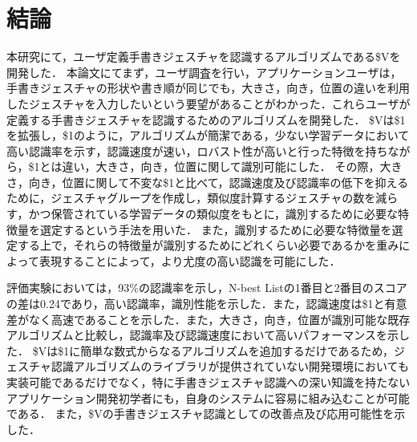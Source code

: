 \chapter{結論}
本研究にて，ユーザ定義手書きジェスチャを認識するアルゴリズムである\$Vを開発した．
本論文にてまず，ユーザ調査を行い，アプリケーションユーザは，手書きジェスチャの形状や書き順が同じでも，大きさ，向き，位置の違いを利用したジェスチャを入力したいという要望があることがわかった．これらユーザが定義する手書きジェスチャを認識するためのアルゴリズムを開発した．
\$Vは\$1を拡張し，\$1のように，アルゴリズムが簡潔である，少ない学習データにおいて高い認識率を示す，認識速度が速い，ロバスト性が高いと行った特徴を持ちながら，\$1とは違い，大きさ，向き，位置に関して識別可能にした．
その際，大きさ，向き，位置に関して不変な\$1と比べて，認識速度及び認識率の低下を抑えるために，ジェスチャグループを作成し，類似度計算するジェスチャの数を減らす，かつ保管されている学習データの類似度をもとに，識別するために必要な特徴量を選定するという手法を用いた．
また，識別するために必要な特徴量を選定する上で，それらの特徴量が識別するためにどれくらい必要であるかを重みによって表現することによって，より尤度の高い認識を可能にした．

評価実験においては，93\%の認識率を示し，N-best Listの1番目と2番目のスコアの差は0.24であり，高い認識率，識別性能を示した．また，認識速度は\$1と有意差がなく高速であることを示した．また，大きさ，向き，位置が識別可能な既存アルゴリズムと比較し，認識率及び認識速度において高いパフォーマンスを示した．
\$Vは\$1に簡単な数式からなるアルゴリズムを追加するだけであるため，ジェスチャ認識アルゴリズムのライブラリが提供されていない開発環境においても実装可能であるだけでなく，特に手書きジェスチャ認識への深い知識を持たないアプリケーション開発初学者にも，自身のシステムに容易に組み込むことが可能である．
また，\$Vの手書きジェスチャ認識としての改善点及び応用可能性を示した．